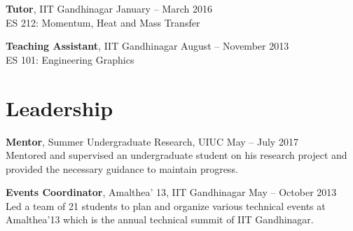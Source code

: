 \documentclass[margin]{res}
\begin{document}
\begin{resume}
{\bf Tutor}, IIT Gandhinagar \hfill January -- March 2016 \\
ES 212: Momentum, Heat and Mass Transfer
\vspace{-0.1cm}

{\bf Teaching Assistant}, IIT Gandhinagar \hfill August -- November 2013 \\
ES 101: Engineering Graphics


\section{\large Leadership}
{\bf Mentor}, Summer Undergraduate Research, UIUC \hfill May -- July 2017 \\
Mentored and supervised an undergraduate student on his research project and provided the necessary guidance to maintain progress.

{\bf Events Coordinator}, Amalthea' 13, IIT Gandhinagar \hfill May -- October 2013 \\
Led a team of 21 students to plan and organize various technical events at Amalthea'13 which is the annual technical summit of IIT Gandhinagar.

%
%

\end{resume}
\end{document}

